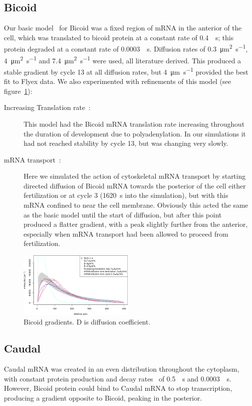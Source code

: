 \documentclass[11pt,a4paper,twocolumn]{article}
\begin{document}
\subsection{Bicoid}
Our basic model~\cite{Grimm2010} for Bicoid was a fixed region of mRNA in the anterior of the cell, which was translated to bicoid protein at a constant rate of \SI{0.4}{\per\second}; this protein degraded at a constant rate of \SI{0.0003}{\per\second}. Diffusion rates of \SI{0.3}{\micro\metre\squared\per\second}, \SI{4}{\micro\metre\squared\per\second} and \SI{7.4}{\micro\metre\squared\per\second} were used, all literature derived. This produced a stable gradient by cycle 13 at all diffusion rates, but  \SI{4}{\micro\metre\per\second} provided the best fit to Flyex data.  We also experimented with refinements of this model (see figure~\ref{fig:bcd-grads}):
\begin{description}
\item[Increasing Translation rate~\cite{Holloway2011}:]
This model had the Bicoid mRNA translation rate increasing throughout the duration of development due to polyadenylation. In our simulations it had not reached stability by cycle 13, but was changing very slowly.
\item[mRNA transport~\cite{Spirov2009}:]
Here we simulated the action of cytoskeletal mRNA transport by starting directed diffusion of Bicoid mRNA towards the posterior of the cell either fertilization or at cycle 3 (\SI{1620}{\second} into the simulation), but with this mRNA confined to near the cell membrane. Obviously this acted the same as the basic model until the start of diffusion, but after this point produced a flatter gradient, with a peak slightly further from the anterior, especially when mRNA transport had been allowed to proceed from fertilization.
\end{description}
\begin{figure}[h]
\includegraphics[width=0.5\textwidth]{writeup-bcd-diffusion}
\caption{Bicoid gradients. D is diffusion coefficient. \label{fig:bcd-grads}}
\end{figure}
\subsection{Caudal}
Caudal mRNA was created in an even distribution throughout the cytoplasm, with constant protein production and decay rates~\cite{Bergmann2007} of \SI{0.5}{\per\second} and \SI{0.0003}{\per\second}. However, Bicoid protein could bind to Caudal mRNA to stop transcription, producing a gradient opposite to Bicoid, peaking in the posterior.
\end{document}
